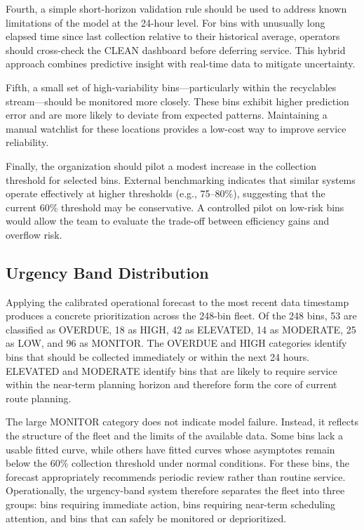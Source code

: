 \documentclass[11pt]{article}
\begin{document}
Fourth, a simple short-horizon validation rule should be used to address known limitations of the model at the 24-hour level. For bins with unusually long elapsed time since last collection relative to their historical average, operators should cross-check the CLEAN dashboard before deferring service. This hybrid approach combines predictive insight with real-time data to mitigate uncertainty.

Fifth, a small set of high-variability bins—particularly within the recyclables stream—should be monitored more closely. These bins exhibit higher prediction error and are more likely to deviate from expected patterns. Maintaining a manual watchlist for these locations provides a low-cost way to improve service reliability.

Finally, the organization should pilot a modest increase in the collection threshold for selected bins. External benchmarking indicates that similar systems operate effectively at higher thresholds (e.g., 75–80\%), suggesting that the current 60\% threshold may be conservative. A controlled pilot on low-risk bins would allow the team to evaluate the trade-off between efficiency gains and overflow risk.

\subsection{Urgency Band Distribution}

Applying the calibrated operational forecast to the most recent data timestamp produces a concrete prioritization across the 248-bin fleet. Of the 248 bins, 53 are classified as OVERDUE, 18 as HIGH, 42 as ELEVATED, 14 as MODERATE, 25 as LOW, and 96 as MONITOR. The OVERDUE and HIGH categories identify bins that should be collected immediately or within the next 24 hours. ELEVATED and MODERATE identify bins that are likely to require service within the near-term planning horizon and therefore form the core of current route planning.

The large MONITOR category does not indicate model failure. Instead, it reflects the structure of the fleet and the limits of the available data. Some bins lack a usable fitted curve, while others have fitted curves whose asymptotes remain below the 60\% collection threshold under normal conditions. For these bins, the forecast appropriately recommends periodic review rather than routine service. Operationally, the urgency-band system therefore separates the fleet into three groups: bins requiring immediate action, bins requiring near-term scheduling attention, and bins that can safely be monitored or deprioritized.
\end{document}
